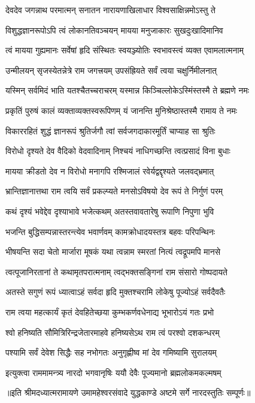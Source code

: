 


\addtocounter{shlokacount}{33}


\twolineshloka
{देवदेव जगन्नाथ परमात्मन् सनातन}
{नारायणाखिलाधार विश्वसाक्षिन्नमोऽस्तु ते} %

\twolineshloka
{विशुद्धज्ञानरूपोऽपि त्वं लोकानतिवञ्चयन्}
{मायया मनुजाकारः सुखदुःखादिमानिव} %

\twolineshloka
{त्वं मायया गुह्यमानः सर्वेषां हृदि संस्थितः}
{स्वयञ्ज्योतिः स्वभावस्त्वं व्यक्त एवामलात्मनाम्} %

\twolineshloka
{उन्मीलयन् सृजस्येतन्नेत्रे राम जगत्त्रयम्}
{उपसंह्रियते सर्वं त्वया चक्षुर्निमीलनात्} %

\twolineshloka
{यस्मिन् सर्वमिदं भाति यतश्चैतच्चराचरम्}
{यस्मान्न किञ्चिल्लोकेऽस्मिंस्तस्मै ते ब्रह्मणे नमः} %

\twolineshloka
{प्रकृतिं पुरुषं कालं व्यक्ताव्यक्तस्वरूपिणम्}
{यं जानन्ति मुनिश्रेष्ठास्तस्मै रामाय ते नमः} %

\twolineshloka
{विकाररहितं शुद्धं ज्ञानरूपं श्रुतिर्जगौ}
{त्वां सर्वजगदाकारमूर्तिं चाप्याह सा श्रुतिः} %

\twolineshloka
{विरोधो दृश्यते देव वैदिको वेदवादिनाम्}
{निश्चयं नाधिगच्छन्ति त्वत्प्रसादं विना बुधाः} %

\twolineshloka
{मायया क्रीडतो देव न विरोधो मनागपि}
{रश्मिजालं रवेर्यद्वद्दृश्यते जलवद्\mbox{}भ्रमात्} %

\twolineshloka
{भ्रान्तिज्ञानात्तथा राम त्वयि सर्वं प्रकल्प्यते}
{मनसोऽविषयो देव रूपं ते निर्गुणं परम्} %

\twolineshloka
{कथं दृश्यं भवेद्देव दृश्याभावे भजेत्कथम्}
{अतस्तवावतारेषु रूपाणि निपुणा भुवि} %

\twolineshloka
{भजन्ति बुद्धिसम्पन्नास्तरन्त्येव भवार्णवम्}
{कामक्रोधादयस्तत्र बहवः परिपन्थिनः} %

\twolineshloka
{भीषयन्ति सदा चेतो मार्जारा मूषकं यथा}
{त्वन्नाम स्मरतां नित्यं त्वद्रूपमपि मानसे} %

\twolineshloka
{त्वत्पूजानिरतानां ते कथामृतपरात्मनाम्}
{त्वद्भक्तसङ्गिनां राम संसारो गोष्पदायते} %

\twolineshloka
{अतस्ते सगुणं रूपं ध्यात्वाऽहं सर्वदा हृदि}
{मुक्तश्चरामि लोकेषु पूज्योऽहं सर्वदैवतैः} %

\twolineshloka
{राम त्वया महत्कार्यं कृतं देवहितेच्छया}
{कुम्भकर्णवधेनाद्य भूभारोऽयं गतः प्रभो} %

\twolineshloka
{श्वो हनिष्यति सौमित्रिरिन्द्रजेतारमाहवे}
{हनिष्यसेऽथ राम त्वं परश्वो दशकन्धरम्} %

\twolineshloka
{पश्यामि सर्वं देवेश सिद्धैः सह नभोगतः}
{अनुगृह्णीष्व मां देव गमिष्यामि सुरालयम्} %

\twolineshloka
{इत्युक्त्वा राममामन्त्र्य नारदो भगवानृषिः}
{ययौ देवैः पूज्यमानो ब्रह्मलोकमकल्मषम्} %

{॥इति श्रीमदध्यात्मरामायणे उमामहेश्वरसंवादे युद्धकाण्डे
अष्टमे सर्गे नारदस्तुतिः सम्पूर्णः॥}

